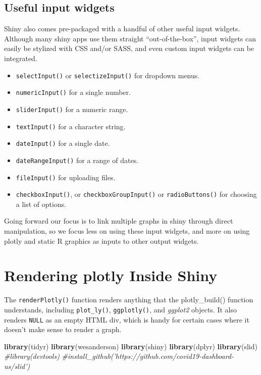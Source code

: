 \documentclass[]{book}
\newenvironment{Shaded}{\begin{snugshade}}{\end{snugshade}}
\newcommand{\KeywordTok}[1]{\textcolor[rgb]{0.13,0.29,0.53}{\textbf{#1}}}
\newcommand{\CommentTok}[1]{\textcolor[rgb]{0.56,0.35,0.01}{\textit{#1}}}
\newcommand{\NormalTok}[1]{#1}
\providecommand{\tightlist}{%
  \setlength{\itemsep}{0pt}\setlength{\parskip}{0pt}}
\begin{document}
\subsection{Useful input widgets}\label{useful-input-widgets}

Shiny also comes pre-packaged with a handful of other useful input
widgets. Although many shiny apps use them straight ``out-of-the-box'',
input widgets can easily be stylized with CSS and/or SASS, and even
custom input widgets can be integrated.

\begin{itemize}
\tightlist
\item
  \texttt{selectInput()} or \texttt{selectizeInput()} for dropdown
  menus.
\item
  \texttt{numericInput()} for a single number.
\item
  \texttt{sliderInput()} for a numeric range.
\item
  \texttt{textInput()} for a character string.
\item
  \texttt{dateInput()} for a single date.
\item
  \texttt{dateRangeInput()} for a range of dates.
\item
  \texttt{fileInput()} for uploading files.
\item
  \texttt{checkboxInput()}, or \texttt{checkboxGroupInput()} or
  \texttt{radioButtons()} for choosing a list of options.
\end{itemize}

Going forward our focus is to link multiple graphs in shiny through
direct manipulation, so we focus less on using these input widgets, and
more on using plotly and static R graphics as inputs to other output
widgets.

\section{Rendering plotly Inside
Shiny}\label{rendering-plotly-inside-shiny}

The \texttt{renderPlotly()} function renders anything that the
plotly\_build() function understands, including \texttt{plot\_ly()},
\texttt{ggplotly()}, and \emph{ggplot2} objects. It also renders
\texttt{NULL} as an empty HTML div, which is handy for certain cases
where it doesn't make sense to render a graph.

\begin{Shaded}
\begin{Highlighting}[]
\KeywordTok{library}\NormalTok{(tidyr)}
\KeywordTok{library}\NormalTok{(wesanderson)}
\KeywordTok{library}\NormalTok{(shiny)}
\KeywordTok{library}\NormalTok{(dplyr)}
\KeywordTok{library}\NormalTok{(slid) }
\CommentTok{#library(devtools)}
\CommentTok{#install_github('https://github.com/covid19-dashboard-us/slid')}
\end{Highlighting}
\end{Shaded}
\end{document}
